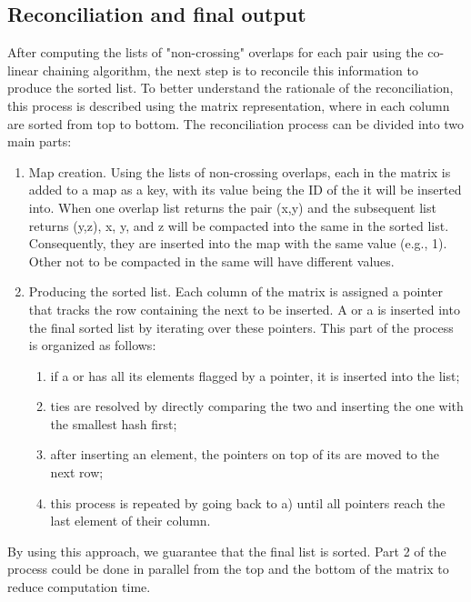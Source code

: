 \subsection{Reconciliation and final output}
After computing the lists of "non-crossing" overlaps for each pair using the co-linear chaining algorithm, the next step is to reconcile this information to produce the sorted list. To better understand the rationale of the reconciliation, this process is described using the matrix representation, where \kmers in each column are sorted from top to bottom. The reconciliation process can be divided into two main parts:
\begin{enumerate}
	\item Map creation. Using the lists of non-crossing overlaps, each \kmer in the matrix is added to a map as a key, with its value being the ID of the \skmer it will be inserted into. When one overlap list returns the pair (x,y) and the subsequent list returns (y,z), \kmers x, y, and z will be compacted into the same \skmer in the sorted list. Consequently, they are inserted into the map with the same value (e.g., 1). Other \skmers not to be compacted in the same \skmer will have different values.
	\item Producing the sorted list. Each column of the matrix is assigned a pointer that tracks the row containing the next \kmer to be inserted. A \kmer or a \skmer is inserted into the final sorted list by iterating over these pointers. This part of the process is organized as follows:
	\begin{enumerate}
	\item if a \kmer or \skmer has all its elements flagged by a pointer, it is inserted into the list;
	\item ties are resolved by directly comparing the two \skmers and inserting the one with the smallest hash first;
	\item after inserting an element, the pointers on top of its \kmers are moved to the next row;
	\item this process is repeated by going back to a) until all pointers reach the last element of their column.
	\end{enumerate}
\end{enumerate}
By using this approach, we guarantee that the final list is sorted. Part 2 of the process could be done in parallel from the top and the bottom of the matrix to reduce computation time.

